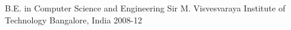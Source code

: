 \begin{cventries}
  \cventry
    {B.E. in Computer Science and Engineering}
    {Sir M. Visvesvaraya Institute of Technology}
    {Bangalore, India}
    {2008-12}
    {
    }
    {}
\end{cventries}

